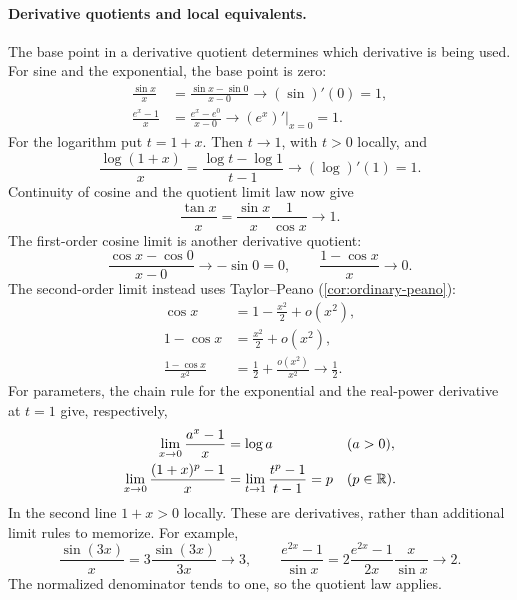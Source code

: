 \paragraph{Derivative quotients and local equivalents.}
The base point in a derivative quotient determines which derivative is
being used. For sine and the exponential, the base point is zero:
\[
\begin{aligned}
\frac{\sin x}{x}&=\frac{\sin x-\sin0}{x-0}
 \longrightarrow(\sin)'(0)=1,\\
\frac{e^x-1}{x}&=\frac{e^x-e^0}{x-0}
 \longrightarrow(e^x)'\big|_{x=0}=1.
\end{aligned}
\]
For the logarithm put $t=1+x$. Then $t\to1$, with $t>0$ locally, and
\[
\frac{\log(1+x)}x=\frac{\log t-\log1}{t-1}
\longrightarrow(\log)'(1)=1.
\]
Continuity of cosine and the quotient limit law now give
\[
\frac{\tan x}{x}=\frac{\sin x}{x}\frac1{\cos x}\longrightarrow1.
\]
The first-order cosine limit is another derivative quotient:
\[
\frac{\cos x-\cos0}{x-0}\longrightarrow-\sin0=0,
\qquad \frac{1-\cos x}{x}\longrightarrow0.
\]
The second-order limit instead uses Taylor--Peano
(\cref{cor:ordinary-peano}):
\[
\begin{aligned}
\cos x&=1-\frac{x^2}{2}+o(x^2),\\
1-\cos x&=\frac{x^2}{2}+o(x^2),\\
\frac{1-\cos x}{x^2}&=\frac12+\frac{o(x^2)}{x^2}
 \longrightarrow\frac12.
\end{aligned}
\]
For parameters, the chain rule for the exponential and the real-power
derivative at $t=1$ give, respectively,
\[
\begin{aligned}
\lim_{x\to0}\frac{a^x-1}{x}&=\log a &&(a>0),\\
\lim_{x\to0}\frac{(1+x)^p-1}{x}
 &=\lim_{t\to1}\frac{t^p-1}{t-1}=p &&(p\in\mathbb{R}).
\end{aligned}
\]
In the second line $1+x>0$ locally. These are derivatives, rather than
additional limit rules to memorize. For example,
\[
\frac{\sin(3x)}x=3\frac{\sin(3x)}{3x}\longrightarrow3,
\qquad
\frac{e^{2x}-1}{\sin x}
=2\frac{e^{2x}-1}{2x}\frac{x}{\sin x}\longrightarrow2.
\]
The normalized denominator tends to one, so the quotient law applies.

